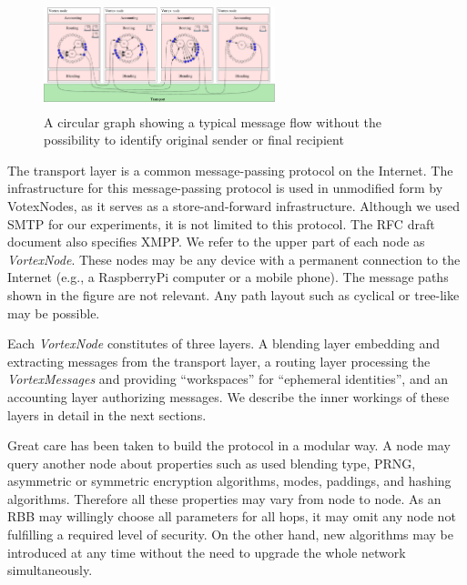 \documentclass[acmsmall, screen]{acmart}
\begin{document}
\begin{figure}[ht]
	\centering\includegraphics[width=0.6\textwidth,height=90pt]{../../inc/roughProtocolDesign}
	\caption{A circular graph showing a typical message flow without the possibility to identify original sender or final recipient}
	\label{fig:protocolLayers}
\end{figure}

The transport layer is a common message-passing protocol on the Internet. The infrastructure for this message-passing protocol is used in unmodified form by VotexNodes, as it serves as a store-and-forward infrastructure. Although we used SMTP for our experiments, it is not limited to this protocol. The RFC draft document also specifies XMPP. We refer to the upper part of each node as \emph{VortexNode}. These nodes may be any device with a permanent connection to the Internet (e.g., a RaspberryPi computer or a mobile phone). The message paths shown in the figure are not relevant. Any path layout such as cyclical or tree-like may be possible.

Each \emph{VortexNode} constitutes of three layers. A blending layer embedding and extracting messages from the transport layer, a routing layer processing the \emph{VortexMessages} and providing ``workspaces'' for ``ephemeral identities'', and an accounting layer authorizing messages. We describe the inner workings of these layers in detail in the next sections.

Great care has been taken to build the protocol in a modular way. A node may query another node about properties such as used blending type, PRNG, asymmetric or symmetric encryption algorithms, modes, paddings, and hashing algorithms. Therefore all these properties may vary from node to node. As an RBB may willingly choose all parameters for all hops, it may omit any node not fulfilling a required level of security. On the other hand, new algorithms may be introduced at any time without the need to upgrade the whole network simultaneously. 
\end{document}
